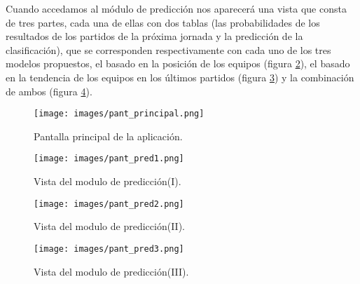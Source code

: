 Cuando accedamos al módulo de predicción nos aparecerá una vista que consta de tres partes, cada una de ellas con dos tablas (las probabilidades de los resultados de los partidos de la próxima jornada y la predicción de la clasificación), que se corresponden respectivamente con cada uno de los tres modelos propuestos, el basado en la posición de los equipos (figura \ref{fig:pmod1}), el basado en la tendencia de los equipos en los últimos partidos (figura \ref{fig:pmod2}) y la combinación de ambos (figura \ref{fig:pmod3}).

\newpage

\begin{figure}[H]
	\centering
	\texttt{[image: images/pant\_principal.png]}
	\caption{Pantalla principal de la aplicación.} \label{fig:pprinc}
\end{figure}
\begin{figure}[H]
	\centering
	\texttt{[image: images/pant\_pred1.png]}
	\caption{Vista del modulo de predicción(I).} \label{fig:pmod1}
\end{figure}
\begin{figure}[H]
	\centering
	\texttt{[image: images/pant\_pred2.png]}
	\caption{Vista del modulo de predicción(II).} \label{fig:pmod2}
\end{figure}
\begin{figure}[H]
	\centering
	\texttt{[image: images/pant\_pred3.png]}
	\caption{Vista del modulo de predicción(III).} \label{fig:pmod3}
\end{figure}